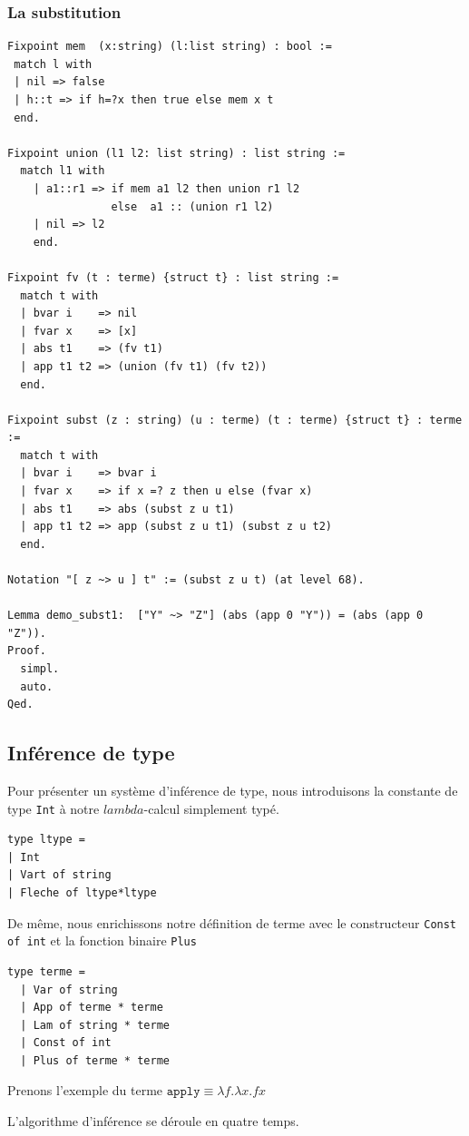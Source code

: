 \documentclass[11pt]{book}
\begin{document}
\subsubsection{La substitution}
\begin{Verbatim}
Fixpoint mem  (x:string) (l:list string) : bool :=
 match l with
 | nil => false
 | h::t => if h=?x then true else mem x t 
 end.

Fixpoint union (l1 l2: list string) : list string :=
  match l1 with
    | a1::r1 => if mem a1 l2 then union r1 l2
                else  a1 :: (union r1 l2)
    | nil => l2
    end.

Fixpoint fv (t : terme) {struct t} : list string :=
  match t with
  | bvar i    => nil
  | fvar x    => [x]
  | abs t1    => (fv t1)
  | app t1 t2 => (union (fv t1) (fv t2))
  end.

Fixpoint subst (z : string) (u : terme) (t : terme) {struct t} : terme :=
  match t with
  | bvar i    => bvar i
  | fvar x    => if x =? z then u else (fvar x)
  | abs t1    => abs (subst z u t1)
  | app t1 t2 => app (subst z u t1) (subst z u t2)
  end.

Notation "[ z ~> u ] t" := (subst z u t) (at level 68).

Lemma demo_subst1:  ["Y" ~> "Z"] (abs (app 0 "Y")) = (abs (app 0 "Z")).
Proof.
  simpl.
  auto.
Qed.
\end{Verbatim}

\subsection{Inférence de type}
Pour présenter un système d'inférence de type, nous introduisons la constante de type \verb+Int+ à notre $lambda$-calcul
simplement typé.

\begin{Verbatim}
type ltype = 
| Int 
| Vart of string
| Fleche of ltype*ltype
\end{Verbatim}

De même, nous enrichissons notre définition de terme avec le constructeur \verb+Const of int+ et la fonction binaire  \verb+Plus+ 
\begin{Verbatim}
type terme = 
  | Var of string 
  | App of terme * terme 
  | Lam of string * terme
  | Const of int
  | Plus of terme * terme
\end{Verbatim}

Prenons l'exemple du terme 
$\mathtt{apply} \equiv \lambda f . \lambda x .fx$

L'algorithme d'inférence se déroule en quatre temps.
\end{document}
